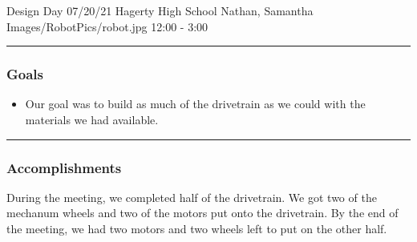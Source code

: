 \insertmeeting 
	{Design Day} 
	{07/20/21}
	{Hagerty High School}
	{Nathan, Samantha}
	{Images/RobotPics/robot.jpg}
	{12:00 - 3:00}
	
\noindent\hfil\rule{\textwidth}{.4pt}\hfil
\subsubsection*{Goals}
\begin{itemize}
    \item Our goal was to build as much of the drivetrain as we could with the materials we had available.  

\end{itemize} 

\noindent\hfil\rule{\textwidth}{.4pt}\hfil

\subsubsection*{Accomplishments}
During the meeting, we completed half of the drivetrain. We got two of the mechanum wheels and two of the motors put onto the drivetrain. By the end of the meeting, we had two motors and two wheels left to put on the other half. 





